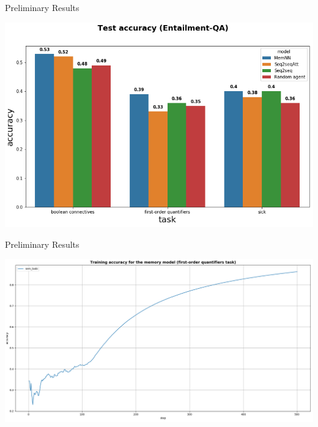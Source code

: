 \documentclass[10pt]{beamer}
\begin{document}
\begin{frame}{Preliminary Results}
\begin{center}
\includegraphics[scale=0.42]{images/comparative_results.png}
\end{center}
\end{frame}



\begin{frame}{Preliminary Results}
\begin{center}
\includegraphics[scale=0.28]{images/training_acc_EntailQA2_mem.png}
\end{center}
\end{frame}
\end{document}
